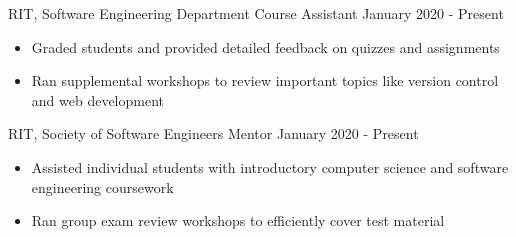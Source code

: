 \documentclass{awesome-cv}
\begin{document}
\begin{cventries}
		\vspace{-0.2cm}
		\end{cventries}
		\begin{cventries}
			\vspace{-0.2cm}
			
			\cventry
				{RIT, Software Engineering Department}
				{Course Assistant\small{\textnormal{\color{graytext}{, Introduction to Software Engineering}}}}
				{January 2020 - Present}
				{}
				{
					\vspace{-0.3cm}
					\begin{itemize}[nosep]
						\item Graded students and provided detailed feedback on quizzes and assignments
						\item Ran supplemental workshops to review important topics like version control and web development
					\end{itemize}
					\vspace{-0.5cm}
				}
				
			\cventry
				{RIT, Society of Software Engineers}
				{Mentor}
				{January 2020 - Present}
				{}
				{
					\vspace{-0.3cm}
					\begin{itemize}[nosep]
						\item Assisted individual students with introductory computer science and software engineering coursework
						\item Ran group exam review workshops to efficiently cover test material
					\end{itemize}
					\vspace{-0.5cm}
				}	
		\end{cventries}
\end{document}
